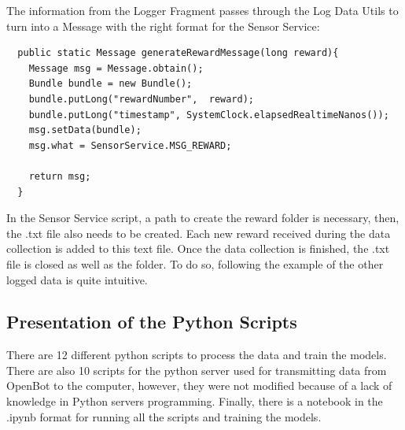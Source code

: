 \documentclass[12pt]{report}
\begin{document}
The information from the Logger Fragment passes through the Log Data Utils to turn into a Message with the right format for the Sensor Service: 
\begin{lstlisting}
  public static Message generateRewardMessage(long reward){
    Message msg = Message.obtain();
    Bundle bundle = new Bundle();
    bundle.putLong("rewardNumber",  reward);
    bundle.putLong("timestamp", SystemClock.elapsedRealtimeNanos());
    msg.setData(bundle);
    msg.what = SensorService.MSG_REWARD;

    return msg;
  }
\end{lstlisting}

In the Sensor Service script, a path to create the reward folder is necessary, then, the .txt file also needs to be created. Each new reward received during the data collection is added to this text file. Once the data collection is finished, the .txt file is closed as well as the folder. To do so, following the example of the other logged data is quite intuitive.



\subsection{Presentation of the Python Scripts}
\label{sub:python}
There are 12 different python scripts to process the data and train the models. There are also 10 scripts for the python server used for transmitting data from OpenBot to the computer, however, they were not modified because of a lack of knowledge in Python servers programming. Finally, there is a notebook in the .ipynb format for running all the scripts and training the models. 
\end{document}
